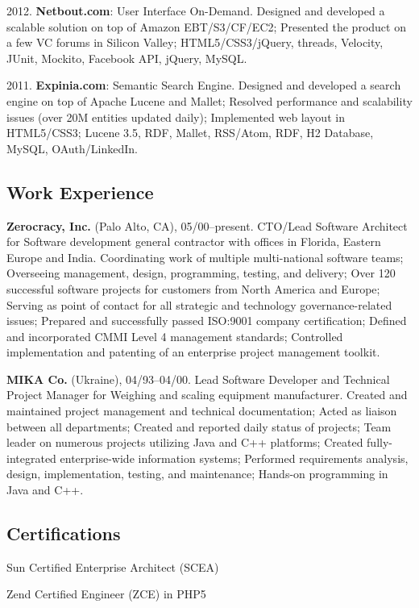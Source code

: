 \documentclass[12pt]{article}
\begin{document}
2012. \textbf{Netbout.com}: User Interface On-Demand.
Designed and developed a scalable solution on top of Amazon EBT/S3/CF/EC2;
Presented the product on a few VC forums in Silicon Valley;
HTML5/CSS3/jQuery, threads, Velocity, JUnit, Mockito, Facebook API, jQuery, MySQL.

2011. \textbf{Expinia.com}: Semantic Search Engine.
Designed and developed a search engine on top of Apache Lucene and Mallet;
Resolved performance and scalability issues (over 20M entities updated daily);
Implemented web layout in HTML5/CSS3;
Lucene 3.5, RDF, Mallet, RSS/Atom, RDF, H2 Database, MySQL, OAuth/LinkedIn.

\subsection*{Work Experience}

\textbf{Zerocracy, Inc.} (Palo Alto, CA), 05/00--present.
CTO/Lead Software Architect for Software development general contractor with offices in Florida, Eastern Europe and India.
Coordinating work of multiple multi-national software teams;
Overseeing management, design, programming, testing, and delivery;
Over 120 successful software projects for customers from North America and Europe;
Serving as point of contact for all strategic and technology governance-related issues;
Prepared and successfully passed ISO:9001 company certification;
Defined and incorporated CMMI Level 4 management standards;
Controlled implementation and patenting of an enterprise project management toolkit.

\textbf{MIKA Co.} (Ukraine), 04/93--04/00.
Lead Software Developer and Technical Project Manager for Weighing and scaling equipment manufacturer.
Created and maintained project management and technical documentation;
Acted as liaison between all departments;
Created and reported daily status of projects;
Team leader on numerous projects utilizing Java and C++ platforms;
Created fully-integrated enterprise-wide information systems;
Performed requirements analysis, design, implementation, testing, and maintenance;
Hands-on programming in Java and C++.

\subsection*{Certifications}

Sun Certified Enterprise Architect (SCEA)

Zend Certified Engineer (ZCE) in PHP5
\end{document}

